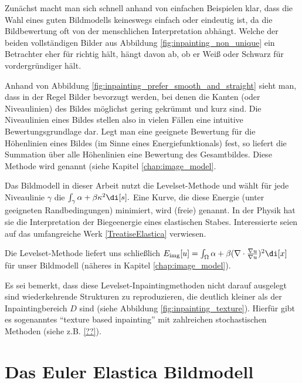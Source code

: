 \documentclass{mythesis}
\begin{document}
Zunächst macht man sich schnell anhand von einfachen Beispielen klar, dass die Wahl eines guten Bildmodells keineswegs einfach oder eindeutig ist, da die Bildbewertung oft von der menschlichen Interpretation abhängt.
Welche der beiden vollständigen Bilder aus Abbildung \ref{fig:inpainting_non_unique} ein Betrachter eher für richtig hält, hängt davon ab, ob er Weiß oder Schwarz für vordergründiger hält.

Anhand von Abbildung \ref{fig:inpainting_prefer_smooth_and_straight} sieht man, dass in der Regel Bilder bevorzugt werden, bei denen die Kanten (oder Niveaulinien) des Bildes möglichst gering gekrümmt und kurz sind.
Die Niveaulinien eines Bildes stellen also in vielen Fällen eine intuitive Bewertungsgrundlage dar.
Legt man eine geeignete Bewertung für die Höhenlinien eines Bildes (im Sinne eines Energiefunktionals) fest, so liefert die Summation über alle Höhenlinien eine Bewertung des Gesamtbildes.
Diese Methode wird  genannt (siehe Kapitel \ref{chap:image_model}.

Das Bildmodell in dieser Arbeit nutzt die Levelset-Methode und wählt für jede Niveaulinie $\gamma$ die 
\begin{math}
    \int_{\gamma} \alpha + \beta \kappa^2 \di[s].
\end{math}
Eine Kurve, die diese Energie (unter geeigneten Randbedingungen) minimiert, wird (freie)  genannt.
In der Physik hat sie die Interpretation der Biegeenergie eines elastischen Stabes.
Interessierte seien auf das umfangreiche Werk \ref{TreatiseElastica} verwiesen.

Die Levelset-Methode liefert uns schließlich
\begin{math}
    \Eimg[u] = \int_{\Omega} \alpha + \beta (\nabla \cdot \frac{\nabla u}{\nabla u})^2 \di[x]
\end{math}
für unser Bildmodell (näheres in Kapitel \ref{chap:image_model}).

Es sei bemerkt, dass diese Levelset-Inpaintingmethoden nicht darauf ausgelegt sind wiederkehrende Strukturen zu reproduzieren, die deutlich kleiner als der Inpaintingbereich $D$ sind (siehe Abbildung \ref{fig:inpainting_texture}).
Hierfür gibt es sogenanntes “texture based inpainting” mit zahlreichen stochastischen Methoden (siehe z.B. \ref{??}).


\chapter{Das Euler Elastica Bildmodell}
\end{document}
